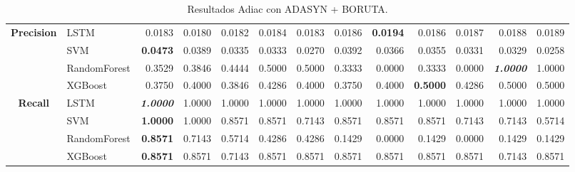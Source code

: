 \begin{table}[H]
\begin{adjustbox}{max width=14cm}
\begin{tabular}{|c|l|r|r|r|r|r|r|r|r|r|r|r|}
			\hline
			\textbf{Precision} &  LSTM &  0.0183 &  0.0180 &  0.0182 &  0.0184 &  0.0183 &  0.0186 & \textbf{  0.0194 } &  0.0186 &  0.0187 &  0.0188 &  0.0189 \\
			&  SVM & \textbf{  0.0473 } &  0.0389 &  0.0335 &  0.0333 &  0.0270 &  0.0392 &  0.0366 &  0.0355 &  0.0331 &  0.0329 &  0.0258 \\
			&  RandomForest &  0.3529 &  0.3846 &  0.4444 &  0.5000 &  0.5000 &  0.3333 &  0.0000 &  0.3333 &  0.0000 & \textit{ \textbf{  1.0000 } } &  1.0000 \\
			&  XGBoost &  0.3750 &  0.4000 &  0.3846 &  0.4286 &  0.4000 &  0.3750 &  0.4000 & \textbf{  0.5000 } &  0.4286 &  0.5000 &  0.5000 \\
			\hline
			\textbf{Recall} &  LSTM & \textit{ \textbf{  1.0000 } } &  1.0000 &  1.0000 &  1.0000 &  1.0000 &  1.0000 &  1.0000 &  1.0000 &  1.0000 &  1.0000 &  1.0000 \\
			&  SVM & \textbf{  1.0000 } &  1.0000 &  0.8571 &  0.8571 &  0.7143 &  0.8571 &  0.8571 &  0.8571 &  0.7143 &  0.7143 &  0.5714 \\
			&  RandomForest & \textbf{  0.8571 } &  0.7143 &  0.5714 &  0.4286 &  0.4286 &  0.1429 &  0.0000 &  0.1429 &  0.0000 &  0.1429 &  0.1429 \\
			&  XGBoost & \textbf{  0.8571 } &  0.8571 &  0.7143 &  0.8571 &  0.8571 &  0.8571 &  0.8571 &  0.8571 &  0.8571 &  0.7143 &  0.8571 \\
			\hline
		\end{tabular}
	\end{adjustbox}
	\caption{Resultados Adiac con ADASYN + BORUTA.}
	\label{tab:Adiac_ADASYN_BORUTA}
\end{table}

